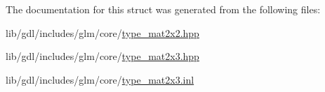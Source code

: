The documentation for this struct was generated from the following files\+:\begin{DoxyCompactItemize}
\item 
lib/gdl/includes/glm/core/\hyperlink{type__mat2x2_8hpp}{type\+\_\+mat2x2.\+hpp}\item 
lib/gdl/includes/glm/core/\hyperlink{type__mat2x3_8hpp}{type\+\_\+mat2x3.\+hpp}\item 
lib/gdl/includes/glm/core/\hyperlink{type__mat2x3_8inl}{type\+\_\+mat2x3.\+inl}\end{DoxyCompactItemize}
